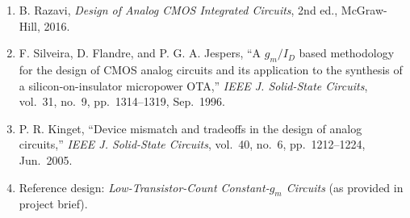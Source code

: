 \documentclass[12pt,a4paper]{article}
\begin{document}
\begin{enumerate}[leftmargin=2em]
  \item B. Razavi, \textit{Design of Analog CMOS Integrated Circuits}, 2nd ed.,
        McGraw-Hill, 2016.
  \item F. Silveira, D. Flandre, and P. G. A. Jespers, ``A $g_m/I_D$ based methodology
        for the design of CMOS analog circuits and its application to the synthesis of a
        silicon-on-insulator micropower OTA,'' \textit{IEEE J. Solid-State Circuits},
        vol.~31, no.~9, pp.~1314--1319, Sep.~1996.
  \item P. R. Kinget, ``Device mismatch and tradeoffs in the design of analog circuits,''
        \textit{IEEE J. Solid-State Circuits}, vol.~40, no.~6, pp.~1212--1224, Jun.~2005.
  \item Reference design: \textit{Low-Transistor-Count Constant-$g_m$ Circuits}
        (as provided in project brief).
\end{enumerate}
\end{document}
